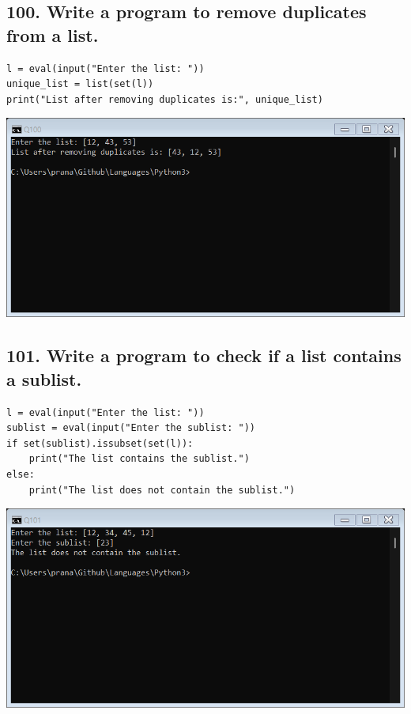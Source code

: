 \documentclass[12pt]{article}
\begin{document}
\subsection*{100. Write a program to remove duplicates from a list.}
\begin{verbatim}
l = eval(input("Enter the list: "))
unique_list = list(set(l))
print("List after removing duplicates is:", unique_list)
\end{verbatim}
\includegraphics[width=\linewidth]{images/100.png}

\subsection*{101. Write a program to check if a list contains a sublist.}
\begin{verbatim}
l = eval(input("Enter the list: "))
sublist = eval(input("Enter the sublist: "))
if set(sublist).issubset(set(l)):
    print("The list contains the sublist.")
else:
    print("The list does not contain the sublist.")
\end{verbatim}
\includegraphics[width=\linewidth]{images/101.png}
\end{document}
